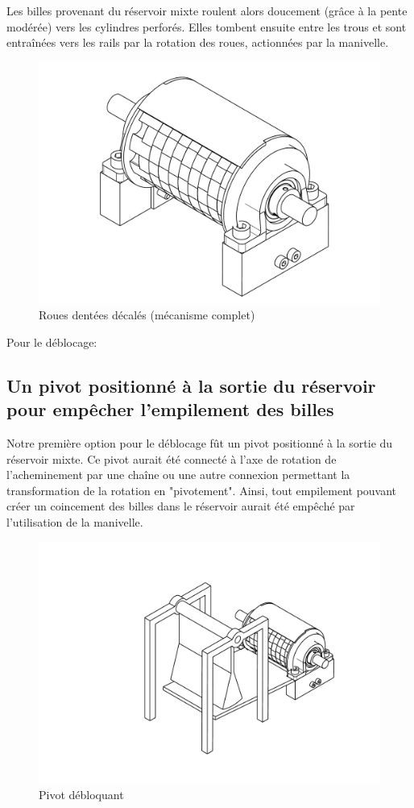 Les billes provenant du réservoir mixte roulent alors doucement (grâce à la pente modérée)  vers les cylindres perforés. Elles tombent ensuite entre les trous et sont entraînées vers les rails par la rotation des roues, actionnées par la manivelle.

\begin{figure}
    \centering
    \includegraphics[width=\textwidth]{Graphics/Roue/DRAWING_COUVERCLE_COMPLET.pdf}
    \caption{Roues dentées décalés (mécanisme complet)}
\end{figure}

Pour le déblocage: %
\subsection{Un pivot positionné à la sortie du réservoir pour empêcher l'empilement des billes} 
Notre première option pour le déblocage fût un pivot positionné à la sortie du réservoir mixte. Ce pivot aurait été connecté à l'axe de rotation de l'acheminement par une chaîne ou une autre connexion permettant la transformation de la rotation en "pivotement". Ainsi, tout empilement pouvant créer un coincement des billes dans le réservoir aurait été empêché par l'utilisation de la manivelle.

\begin{figure}
    \centering
    \includegraphics[width=\textwidth]{Graphics/Roue/DRAWING_PIVOT.pdf}
    \caption{Pivot débloquant}
\end{figure}

